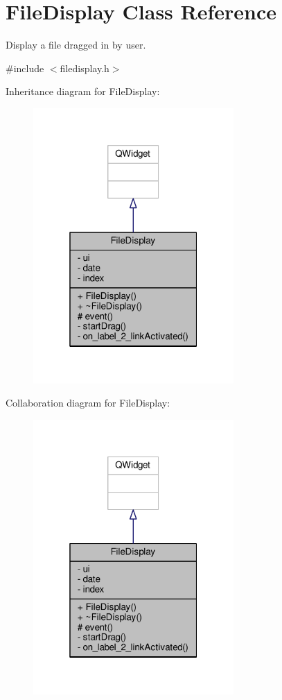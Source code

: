 \hypertarget{classFileDisplay}{}\section{File\+Display Class Reference}
\label{classFileDisplay}


Display a file dragged in by user.  




{\ttfamily \#include $<$filedisplay.\+h$>$}



Inheritance diagram for File\+Display\+:
\nopagebreak
\begin{figure}[H]
\begin{center}
\leavevmode
\includegraphics[width=217pt]{classFileDisplay__inherit__graph}
\end{center}
\end{figure}


Collaboration diagram for File\+Display\+:
\nopagebreak
\begin{figure}[H]
\begin{center}
\leavevmode
\includegraphics[width=217pt]{classFileDisplay__coll__graph}
\end{center}
\end{figure}
